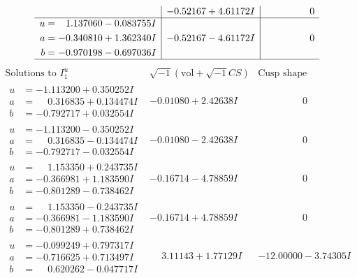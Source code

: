 \documentclass[1p]{elsarticle_modified}
\theoremstyle{definition}
\newcommand{\I}{\sqrt{-1}}
\begin{document}
$$\begin{array}{c|c|c}
 & -0.52167 + 4.61172 I & \phantom{-0.000000 } 0 \\ \hline\begin{aligned}
u &= \phantom{-}1.137060 - 0.083755 I \\
a &= -0.340810 + 1.362340 I \\
b &= -0.970198 - 0.697036 I\end{aligned}
 & -0.52167 - 4.61172 I & \phantom{-0.000000 } 0\\
 \hline 
 \end{array}$$\newpage$$\begin{array}{c|c|c}  
\text{Solutions to }I^u_{1}& \I (\text{vol} + \sqrt{-1}CS) & \text{Cusp shape}\\
 \hline 
\begin{aligned}
u &= -1.113200 + 0.350252 I \\
a &= \phantom{-}0.316835 + 0.134474 I \\
b &= -0.792717 + 0.032554 I\end{aligned}
 & -0.01080 + 2.42638 I & \phantom{-0.000000 } 0 \\ \hline\begin{aligned}
u &= -1.113200 - 0.350252 I \\
a &= \phantom{-}0.316835 - 0.134474 I \\
b &= -0.792717 - 0.032554 I\end{aligned}
 & -0.01080 - 2.42638 I & \phantom{-0.000000 } 0 \\ \hline\begin{aligned}
u &= \phantom{-}1.153350 + 0.243735 I \\
a &= -0.366981 + 1.183590 I \\
b &= -0.801289 - 0.738462 I\end{aligned}
 & -0.16714 - 4.78859 I & \phantom{-0.000000 } 0 \\ \hline\begin{aligned}
u &= \phantom{-}1.153350 - 0.243735 I \\
a &= -0.366981 - 1.183590 I \\
b &= -0.801289 + 0.738462 I\end{aligned}
 & -0.16714 + 4.78859 I & \phantom{-0.000000 } 0 \\ \hline\begin{aligned}
u &= -0.099249 + 0.797317 I \\
a &= -0.716625 + 0.713497 I \\
b &= \phantom{-}0.620262 - 0.047717 I\end{aligned}
 & \phantom{-}3.11143 + 1.77129 I & -12.00000 - 3.74305 I \\ \hline\begin{aligned}

\end{aligned}
\end{array}$$
\end{document}
